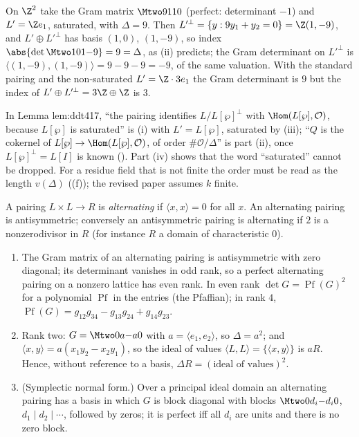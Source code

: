 \begin{example}\label{ex:modules:gram}
On $\Z^2$ take the Gram matrix $\Mtwo9110$ (perfect: determinant $-1$) and $L'=\Z e_1$, saturated, with $\Delta=9$. Then
$L'^\perp=\{y:9y_1+y_2=0\}=\Z(1,-9)$, and $L'\oplus L'^\perp$ has basis $(1,0)$, $(1,-9)$, so index $\abs{\det\Mtwo101{-9}}=9=\Delta$, as
(ii) predicts; the Gram determinant on $L'^\perp$ is $\langle(1,-9),(1,-9)\rangle=9-9-9=-9$, of the same valuation. With
the standard pairing and the non-saturated $L'=\Z\cdot3e_1$ the Gram determinant is $9$ but the index of $L'\oplus L'^\perp=3\Z\oplus\Z$ is $3$.
\end{example}

\begin{paperlink}\label{pl:modules:gram}
In Lemma lem:ddt417, ``the pairing identifies $L/L[\wp]^\perp$ with $\Hom(L[\wp],\mathcal O)$, because $L[\wp]$ is saturated'' is
(i) with $L'=L[\wp]$, saturated by (iii); ``$Q$ is the cokernel of $L[\wp]\to\Hom(L[\wp],\mathcal O)$,
of order $\#\mathcal O/\Delta$'' is part (ii), once $L[\wp]^\perp=L[I]$ is known (). Part (iv) shows that the word
``saturated'' cannot be dropped. For a residue field that is not finite the order must be read as the length $v(\Delta)$
((f)); the revised paper assumes $k$ finite.
\end{paperlink}

\begin{proposition}\label{prop:modules:alternating}
A pairing $L\times L\to R$ is \emph{alternating} if $\langle x,x\rangle=0$ for all $x$. An alternating pairing is antisymmetric; conversely an antisymmetric
pairing is alternating if $2$ is a nonzerodivisor in $R$ (for instance $R$ a domain of characteristic $0$).
\begin{enumerate}[label=(\roman*)]
\item The Gram matrix of an alternating pairing is antisymmetric with zero diagonal; its determinant vanishes in odd rank, so a perfect alternating
pairing on a nonzero lattice has even rank. In even rank $\det G=\operatorname{Pf}(G)^2$ for a polynomial $\operatorname{Pf}$ in the entries (the Pfaffian); in rank $4$,
$\operatorname{Pf}(G)=g_{12}g_{34}-g_{13}g_{24}+g_{14}g_{23}$.
\item Rank two: $G=\Mtwo0a{-a}0$ with $a=\langle e_1,e_2\rangle$, so $\Delta=a^2$; and $\langle x,y\rangle=a(x_1y_2-x_2y_1)$, so the ideal of values $\langle L,L\rangle=\{\langle x,y\rangle\}$ is
$aR$. Hence, without reference to a basis, $\Delta R=(\text{ideal of values})^2$.
\item (Symplectic normal form.) Over a principal ideal domain an alternating pairing has a basis in which $G$ is block diagonal with blocks
$\Mtwo0{d_i}{-d_i}0$, $d_1\mid d_2\mid\cdots$, followed by zeros; it is perfect iff all $d_i$ are units and there is no zero block.
\end{enumerate}
\end{proposition}


